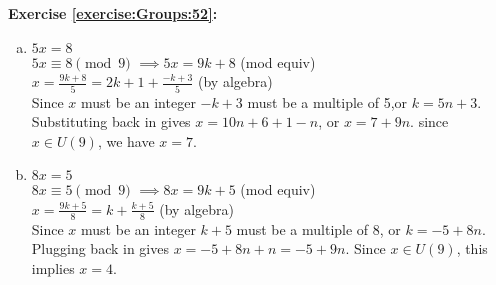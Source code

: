 \noindent\textbf{Exercise \ref{exercise:Groups:52}:}
\begin{enumerate}[(a)]
\item
$5x=8$\\
$5x \equiv 8 \pmod{9}$
$\implies 5x = 9k + 8$ \quad \quad (mod equiv)\\
$x = \frac{9k + 8}{5} = 2k + 1 + \frac{-k+3}{5}$ \quad \quad (by algebra)\\
Since $x$ must be an integer $-k+3$ must be a multiple of 5,or $k = 5n + 3$. Substituting back in gives $x = 10n+6+1-n$, or $x = 7+9n$.  since $x \in U(9)$, we have $x=7$.



\item
$8x=5$\\
$8x \equiv 5 \pmod{9}$
$\implies 8x = 9k + 5$ \quad \quad (mod equiv)\\
$x = \frac{9k + 5}{8} = k + \frac{k+5}{8}$ \quad \quad (by algebra)\\
Since $x$ must be an integer $k + 5$ must be a multiple of 8, or $k = -5 + 8n$.\\
Plugging back in gives $x = -5 + 8n +n=-5 + 9n$. Since $x \in U(9)$, this implies $x=4$.
\end{enumerate}


